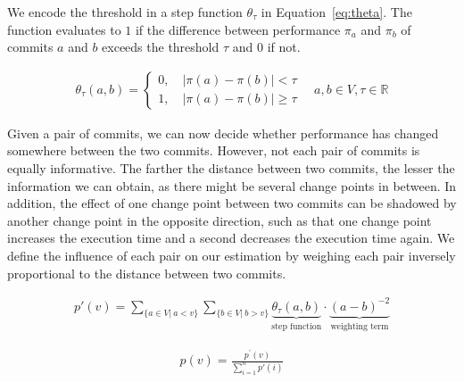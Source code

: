 \documentclass[sigconf]{acmart}
\begin{document}
	We encode the threshold in a step function $\theta_\tau$ in Equation~\ref{eq:theta}.
	The function evaluates to $1$ if the difference between performance $\pi_a$ and $\pi_b$ of commits $a$ and $b$ exceeds the threshold $\tau$ and $0$ if not.
	
	\begin{equation}\label{eq:theta}
	\begin{gathered}
	\theta_\tau(a, b) = \begin{cases}
	0,\quad \vert\pi(a) - \pi(b)\vert < \tau\\
	1,\quad \vert\pi(a) - \pi(b)\vert \geq \tau
	\end{cases}\quad a, b \in V, \tau \in \mathbb{R}
	\end{gathered}
	\end{equation}
	
	Given a pair of commits, we can now decide whether performance has changed somewhere between the two commits.
	However, not each pair of commits is equally informative.
	The farther the distance between two commits, the lesser the information we can obtain, as there might be several change points in between. 
	In addition, the effect of one change point between two commits can be shadowed by another change point in the opposite direction, such as that one change point increases the execution time and a second decreases the execution time again.
	We define the influence of each pair on our estimation by weighing each pair inversely proportional to the distance between two commits.
	
	\begin{equation}\label{eq:cpp}
	\begin{gathered}
	p'(v) = \sum_{\lbrace a \in V \vert~ a < v\rbrace} \sum_{\lbrace b \in V \vert~ b > v\rbrace} \underbrace{\theta_\tau(a, b)}_{\text{step function}} \cdot \underbrace{(a-b)^{-2}}_{\text{weighting term}}
	\end{gathered}
	\end{equation}
	
	\begin{equation}\label{eq:normalize}
	\begin{gathered}
	p(v) = \frac{p^\prime(v)}{\sum_{i=1}^{n} p'(i)}
	\end{gathered}
	\end{equation}
	
\end{document}
